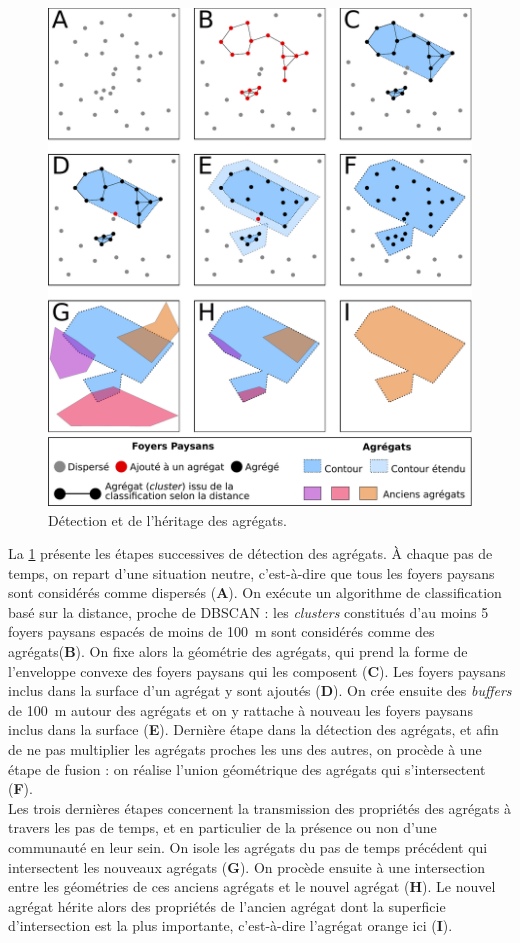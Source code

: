 \begin{figure}[H]
	\centering
	\includegraphics[width=.75\linewidth]{img/detection_agregats.pdf}
	\caption{Détection et de l'héritage des agrégats.}
	\label{fig:detection-agregats}
\end{figure}
\vspace*{-.75cm}
La \cref{fig:detection-agregats} présente les étapes successives de détection des agrégats.
À chaque pas de temps, on repart d'une situation \og neutre\fg{}, c'est-à-dire que tous les foyers paysans sont considérés comme dispersés (\textbf{A}).
On exécute un algorithme de classification basé sur la distance, proche de DBSCAN : les \textit{clusters} constitués d'au moins 5 foyers paysans espacés de moins de 100~m sont considérés comme des agrégats(\textbf{B}).
On fixe alors la géométrie des agrégats, qui prend la forme de l'enveloppe convexe des foyers paysans qui les composent (\textbf{C}).
Les foyers paysans inclus dans la surface d'un agrégat y sont ajoutés (\textbf{D}).
On crée ensuite des \textit{buffers} de 100~m autour des agrégats et on y rattache à nouveau les foyers paysans inclus dans la surface (\textbf{E}).
Dernière étape dans la détection des agrégats, et afin de ne pas multiplier les agrégats proches les uns des autres, on procède à une étape de fusion : on réalise l'union géométrique des agrégats qui s'intersectent (\textbf{F}).\\
Les trois dernières étapes concernent la transmission des propriétés des agrégats à travers les pas de temps, et en particulier de la présence ou non d'une communauté en leur sein.
On isole les agrégats du pas de temps précédent qui intersectent les nouveaux agrégats (\textbf{G}).
On procède ensuite à une intersection entre les géométries de ces anciens agrégats et le nouvel agrégat (\textbf{H}).
Le nouvel agrégat hérite alors des propriétés de l'ancien agrégat dont la superficie d'intersection est la plus importante, c'est-à-dire l'agrégat orange ici (\textbf{I}).
	
